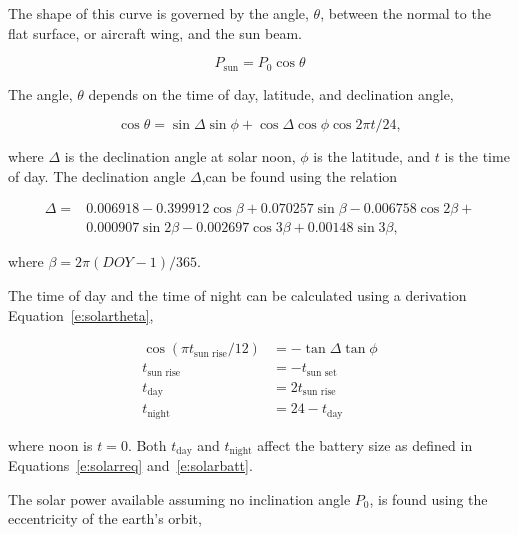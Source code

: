 \documentclass[]{aiaa-tc}%
\begin{document}
The shape of this curve is governed by the angle, $\theta$, between the normal to the flat surface, or aircraft wing, and the sun beam.\cite{solar}

\begin{equation}
    \label{e:solarp}
    P_{\text{sun}} = P_0 \cos{\theta}
\end{equation}

The angle, $\theta$ depends on the time of day, latitude, and declination angle,\cite{solar}

    \begin{equation}
        \label{e:solartheta}
        \cos{\theta} = \sin{\Delta} \sin{\phi} + \cos{\Delta} \cos{\phi} \cos{2\pi t/24},
    \end{equation}

    where $\Delta$ is the declination angle at solar noon, $\phi$ is the latitude, and $t$ is the time of day.\cite{solar}  The declination angle $\Delta$,can be found using the relation\cite{solar} 

    \begin{align}
        \label{e:solardelta}
        \Delta = &0.006918 - 0.399912 \cos{\beta} + 0.070257\sin{\beta} - 0.006758\cos{2\beta} + \nonumber \\
        & 0.000907\sin{2\beta} - 0.002697\cos{3\beta} + 0.00148\sin{3\beta},
    \end{align}

    where $\beta = 2\pi (DOY-1)/365$.

    The time of day and the time of night can be calculated using a derivation Equation~\eqref{e:solartheta}, \cite{solar}

    \begin{align}
        \label{e:solartday}
        \cos{(\pi t_{\text{sun rise}}/12)} &= -\tan{\Delta} \tan{\phi} \\
        \label{e:solarsunrise}
        t_{\text{sun rise}} &= -t_{\text{sun set}} \\
        \label{e:solartday2}
        t_{\text{day}} &= 2t_{\text{sun rise}} \\
        \label{e:solartnight}
        t_{\text{night}} &= 24 - t_{\text{day}}
    \end{align}

    where noon is $t=0$. Both $t_{\text{day}}$ and $t_{\text{night}}$ affect the battery size as defined in Equations~\ref{e:solarreq} and~\ref{e:solarbatt}. 

    The solar power available assuming no inclination angle $P_0$, is found using the eccentricity of the earth's orbit, 
\end{document}
